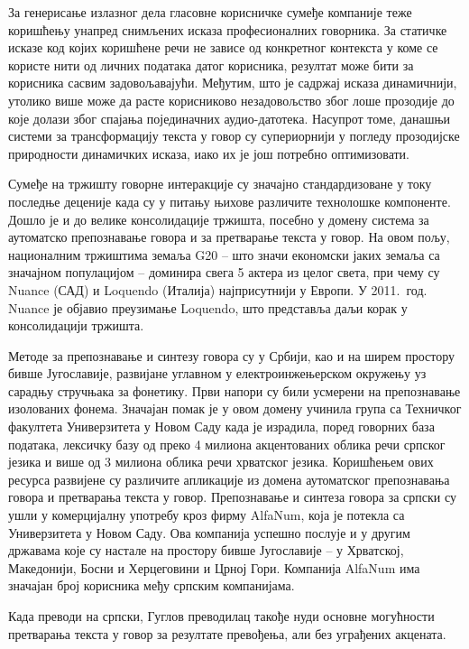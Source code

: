 \begin{multicols}{2}

За генерисање излазног дела гласовне корисничке сумеђе компаније теже коришћењу унапред снимљених исказа професионалних говорника. За статичке исказе код којих коришћене речи не зависе од конкретног контекста у коме се користе нити од личних података датог корисника, резултат може бити за корисника сасвим задовољавајући. Међутим, што је садржај исказа динамичнији, утолико више може да расте корисниково незадовољство због лоше прозодије до које долази  због спајања појединачних аудио-датотека. Насупрот томе, данашњи системи за трансформацију текста у говор су супериорнији у погледу прозодијске природности динамичких исказа, иако их је још потребно оптимизовати. 

Сумеђе на тржишту говорне интеракције су значајно стандардизоване у току последње деценије када су у питању њихове различите технолошке компоненте. Дошло је и до велике консолидације тржишта, посебно у домену система за аутоматско препознавање говора и за претварање текста у говор. На овом пољу, националним тржиштима земаља G20 -- што значи економски јаких земаља са значајном популацијом -- доминира свега 5 актера из целог света, при чему су Nuance  (САД) и Loquendo (Италија) најприсутнији у Европи. У 2011.~год. Nuance  је објавио преузимање Loquendo, што представља даљи корак у консолидацији тржишта.

Методе за препознавање и синтезу говора су у Србији, као и на ширем простору бивше Југославије, развијане углавном у електроинжењерском окружењу уз сарадњу стручњака за фонетику. Први напори су били усмерени на препознавање изолованих фонема. Значајан помак је у овом домену учинила група са Техничког факултета Универзитета у Новом Саду када је израдила, поред говорних база података, лексичку базу од преко 4 милиона акцентованих облика речи српског језика и више од 3 милиона облика речи хрватског језика. Коришћењем ових ресурса развијене су различите апликације из домена аутоматског препознавања говора и претварања текста у говор. Препознавање и синтеза говора за српски су ушли у комерцијалну употребу кроз фирму AlfaNum, која је потекла са Универзитета у Новом Саду. Ова компанија успешно послује и у другим државама које су настале на простору бивше Југославије – у Хрватској, Македонији, Босни и Херцеговини и Црној Гори. Компанија AlfaNum има значајан број корисника међу српским компанијама. 

Када преводи на српски, Гуглов преводилац такође нуди основне могућности претварања текста у говор за резултате превођења, али без уграђених акцената. 


\end{multicols}
